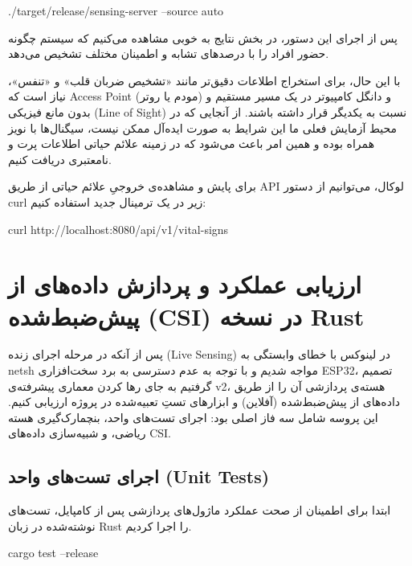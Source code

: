 \documentclass[12pt, a4paper]{article}
\newcommand{\lr}[1]{\foreignlanguage{english}{#1}}
\begin{document}
\begin{otherlanguage}{english}
\begin{terminalbox}
./target/release/sensing-server --source auto
\end{terminalbox}
\end{otherlanguage}

پس از اجرای این دستور، در بخش نتایج به خوبی مشاهده می‌کنیم که سیستم چگونه حضور افراد را با درصدهای تشابه و اطمینان مختلف تشخیص می‌دهد. 

با این حال، برای استخراج اطلاعات دقیق‌تر مانند «تشخیص ضربان قلب» و «تنفس»، نیاز است که \lr{Access Point} (مودم یا روتر) و دانگل کامپیوتر در یک مسیر مستقیم و بدون مانع فیزیکی (\lr{Line of Sight}) نسبت به یکدیگر قرار داشته باشند. از آنجایی که در محیط آزمایش فعلی ما این شرایط به صورت ایده‌آل ممکن نیست، سیگنال‌ها با نویز همراه بوده و همین امر باعث می‌شود که در زمینه علائم حیاتی اطلاعات پرت و نامعتبری دریافت کنیم.

برای پایش و مشاهده‌ی خروجیِ علائم حیاتی از طریق \lr{API} لوکال، می‌توانیم از دستور \lr{curl} زیر در یک ترمینال جدید استفاده کنیم:

\begin{otherlanguage}{english}
\begin{terminalbox}
curl http://localhost:8080/api/v1/vital-signs
\end{terminalbox}
\end{otherlanguage}

\section{ارزیابی عملکرد و پردازش داده‌های از پیش‌ضبط‌شده (\lr{CSI}) در نسخه \lr{Rust}}
پس از آنکه در مرحله اجرای زنده (\lr{Live Sensing}) در لینوکس با خطای وابستگی به \lr{netsh} مواجه شدیم و با توجه به عدم دسترسی به برد سخت‌افزاری \lr{ESP32}، تصمیم گرفتیم به جای رها کردن معماری پیشرفته‌ی \lr{v2}، هسته‌ی پردازشی آن را از طریق داده‌های از پیش‌ضبط‌شده (آفلاین) و ابزارهای تستِ تعبیه‌شده در پروژه ارزیابی کنیم. این پروسه شامل سه فاز اصلی بود: اجرای تست‌های واحد، بنچمارک‌گیری هسته ریاضی، و شبیه‌سازی داده‌های \lr{CSI}.

\subsection{اجرای تست‌های واحد (\lr{Unit Tests})}
ابتدا برای اطمینان از صحت عملکرد ماژول‌های پردازشی پس از کامپایل، تست‌های نوشته‌شده در زبان \lr{Rust} را اجرا کردیم.

\begin{otherlanguage}{english}
\begin{terminalbox}
cargo test --release
\end{terminalbox}
\end{otherlanguage}
\end{document}
